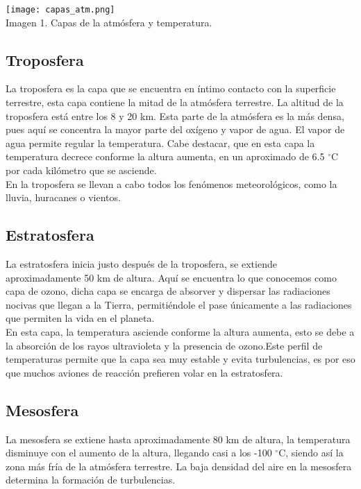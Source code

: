 \documentclass{article}
\begin{document}
\begin{doublespace}
\begin{center} \texttt{[image: capas\_atm.png]} 
\\Imagen 1. Capas de la atmósfera y temperatura. \end{center} 
 

\subsection{Troposfera}
La troposfera es la capa que se encuentra en íntimo contacto con la superficie terrestre, esta capa contiene la mitad de la atmósfera terrestre. La altitud de la troposfera está entre los 8 y 20 km. Esta parte de la atmósfera es la más densa, pues aquí se concentra la mayor parte del oxígeno y vapor de agua. El vapor de agua permite regular la temperatura. Cabe destacar, que en esta capa la temperatura decrece conforme la altura aumenta, en un aproximado de 6.5 $^{\circ}$C por cada kilómetro que se asciende. 
\\

En la troposfera se llevan a cabo todos los fenómenos meteorológicos, como la lluvia, huracanes o vientos.

\subsection{Estratosfera}
La estratosfera inicia justo después de la troposfera, se extiende aproximadamente 50 km de altura. Aquí se encuentra lo que conocemos como capa de ozono, dicha capa se encarga de absorver y dispersar las radiaciones nocivas que llegan a la Tierra, permitiéndole el pase únicamente a las radiaciones que permiten la vida en el planeta. 
\\

En esta capa, la temperatura asciende conforme la altura aumenta, esto se debe a la absorción de los rayos ultravioleta y la presencia de ozono.Este perfil de temperaturas permite que la capa sea muy estable y evita turbulencias, es por eso que muchos aviones de reacción prefieren volar en la estratosfera.

\subsection{Mesosfera}

La mesosfera se extiene hasta aproximadamente 80 km de altura, la temperatura disminuye con el aumento de la altura, llegando casi a los -100 $^{\circ}$C, siendo así la zona más fría de la atmósfera terrestre. La baja densidad del aire en la mesosfera determina la formación de turbulencias.
\\


\end{doublespace}
\end{document}
